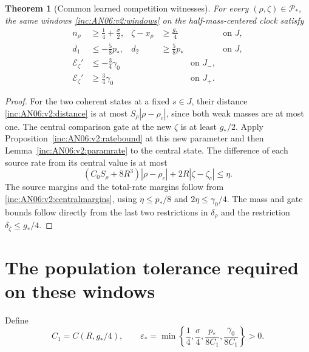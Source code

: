\documentclass[11pt]{article}
\numberwithin{equation}{section}
\newtheorem{theorem}{Theorem}[section]
\theoremstyle{remark}\newtheorem{remark}[theorem]{Remark}
\newcommand{\1}{\mathbf 1}
\begin{document}
\begin{theorem}[Common learned competition witnesses]
\label{inc:AN06:v2:uniformtheorem}
For every $(\rho,\zeta)\in\mathcal P_*$, the \emph{same} windows
\eqref{inc:AN06:v2:windows} on the half-mass-centered clock satisfy
\begin{align}
 n_\rho&\ge\tfrac14+\tfrac\sigma2,
 &\zeta-x_\rho&\ge\tfrac{g_*}{4} &&\text{on }J,\nonumber\\
 d_1&\le-\tfrac58p_*,& d_2&\ge\tfrac58p_* &&\text{on }J,
 \label{inc:AN06:v2:uniformmargins}\\
 \mathcal E_\zeta'&\le-\tfrac34\gamma_0&&&\text{on }J_-,\nonumber\\
 \mathcal E_\zeta'&\ge\tfrac34\gamma_0&&&\text{on }J_+.\nonumber
\end{align}
\end{theorem}
\begin{proof}
For the two coherent states at a fixed $s\in J$, their distance
\eqref{inc:AN06:v2:distance} is at most $S_\rho|\rho-\rho_c|$,
since both weak masses are at most one.
The central comparison gate at the new $\zeta$ is at least $g_*/2$.
Apply Proposition~\ref{inc:AN06:v2:ratebound} at this new parameter and
then Lemma~\ref{inc:AN06:v2:paramrate} to the central state. The difference
of each source rate from its central value is at most
\[
 (C_0S_\rho+8R^3)|\rho-\rho_c|+2R|\zeta-\zeta_c|\le\eta.
\]
The source margins and the total-rate margins follow from
\eqref{inc:AN06:v2:centralmargins}, using
$\eta\le p_*/8$ and $2\eta\le\gamma_0/4$.
The mass and gate bounds follow directly from the last two restrictions
in $\delta_\rho$ and the restriction $\delta_\zeta\le g_*/4$.
\end{proof}

\section{The population tolerance required on these windows}
\label{inc:AN06:v2:tolerance}
Define
\begin{equation}\label{inc:AN06:v2:epsdef}
 C_1=C(R,g_*/4),\qquad
 \varepsilon_*=
 \min\left\{\frac14,\frac\sigma4,\frac{p_*}{8C_1},
                         \frac{\gamma_0}{8C_1}\right\}>0.
\end{equation}
\end{document}
